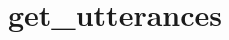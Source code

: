 \label{appendix:get-utterances}
\chapter{get\_utterances}

\inputminted{python}{code/get_utterances}
